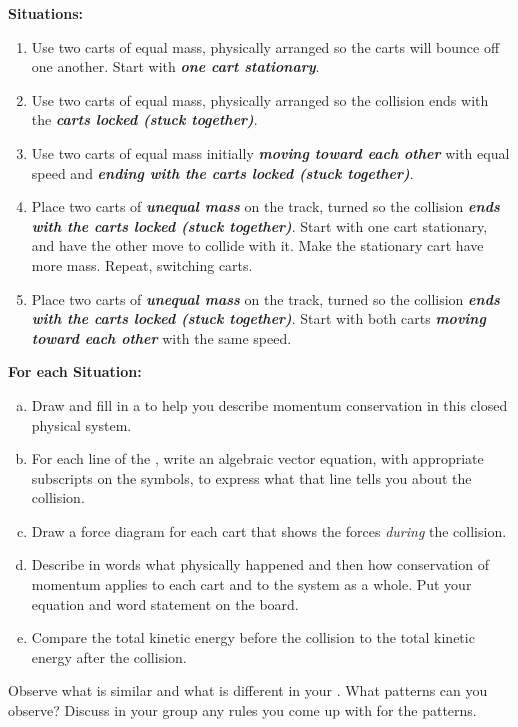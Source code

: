 \noindent\textbf{Situations:}
\begin{enumerate}
	\item Use two carts of equal mass, physically arranged so the carts will bounce off one another. Start with \textbf{\em one cart stationary}.
	\item Use two carts of equal mass, physically arranged so the collision ends with the \textbf{\em carts locked (stuck together)}.
	\item Use two carts of equal mass initially \textbf{\em moving toward each other} with equal speed and \textbf{\em ending with the carts locked (stuck together)}.
	\item Place two carts of \textbf{\em unequal mass} on the track, turned so the collision \textbf{\em ends with the carts locked (stuck together)}. Start with one cart stationary, and have the other move to collide with it. Make the stationary cart have more mass. Repeat, switching carts.
	\item Place two carts of \textbf{\em unequal mass} on the track, turned so the collision \textbf{\em ends with the carts locked (stuck together)}. Start with both carts \textbf{\em moving toward each other} with the same speed.
\end{enumerate}

\noindent
\textbf{For each Situation:}
\begin{enumerate}[(a)]
	\item Draw and fill in a \pchart{} to help you describe momentum conservation in this closed physical system.
	\item For each line of the \pchart{}, write an algebraic vector equation, with appropriate subscripts on the symbols, to express what that line tells you about the collision.
	\item Draw a force diagram for each cart that shows the forces \emph{during} the collision.
	\item Describe in words what physically happened and then how conservation of momentum applies to each cart and to the system as a whole. Put your equation and word statement on the board.
	\item Compare the total kinetic energy before the collision to the total kinetic energy after the collision.%
\end{enumerate}

\noindent Observe what is similar and what is different in your \pcharts{}. What patterns can you observe? Discuss in your group any rules you come up with for the patterns.

\WCD